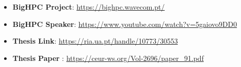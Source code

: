 \documentclass[10pt,a4paper,ragged2e,withhyper]{altacv}
\begin{document}
\begin{paracol}{2}
      
    
      \begin{itemize}
            \item \textbf{BigHPC Project}: \url{https://bighpc.wavecom.pt/}
            \item \textbf{BigHPC Speaker}: \url{https://www.youtube.com/watch?v=5gaiovo9DD0}
            \item \textbf{Thesis Link}: \url{https://ria.ua.pt/handle/10773/30553}
            \item \textbf{Thesis Paper }: \url{https://ceur-ws.org/Vol-2696/paper_91.pdf}
      \end{itemize}

\switchcolumn

       \\ \smallbreak

\end{paracol}
\end{document}
